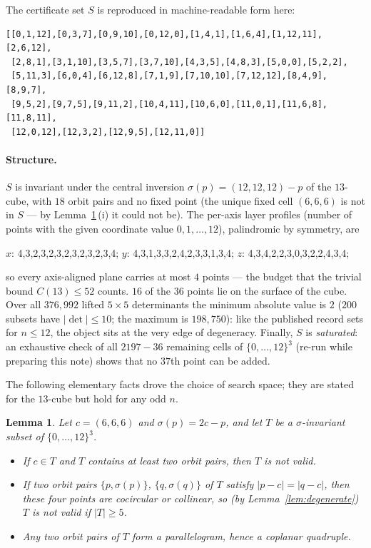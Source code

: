 \documentclass[10pt]{article}
\newtheorem{lemma}[theorem]{Lemma}
\theoremstyle{remark}
\begin{document}
The certificate set $S$ is reproduced in machine-readable form here:

{\scriptsize
\begin{verbatim}
[[0,1,12],[0,3,7],[0,9,10],[0,12,0],[1,4,1],[1,6,4],[1,12,11],[2,6,12],
 [2,8,1],[3,1,10],[3,5,7],[3,7,10],[4,3,5],[4,8,3],[5,0,0],[5,2,2],
 [5,11,3],[6,0,4],[6,12,8],[7,1,9],[7,10,10],[7,12,12],[8,4,9],[8,9,7],
 [9,5,2],[9,7,5],[9,11,2],[10,4,11],[10,6,0],[11,0,1],[11,6,8],[11,8,11],
 [12,0,12],[12,3,2],[12,9,5],[12,11,0]]
\end{verbatim}
}

\paragraph{Structure.}
$S$ is invariant under the central inversion $\sigma(p) = (12,12,12) - p$ of
the $13$-cube, with $18$ orbit pairs and no fixed point (the unique fixed
cell $(6,6,6)$ is not in $S$ --- by Lemma~\ref{lem:sym}\,(i) it could not
be). The per-axis layer profiles (number of points with the given
coordinate value $0,1,\dots,12$), palindromic by symmetry, are
\begin{center}\small
$x$: 4,3,2,3,2,3,2,3,2,3,2,3,4;\qquad
$y$: 4,3,1,3,3,2,4,2,3,3,1,3,4;\qquad
$z$: 4,3,4,2,2,3,0,3,2,2,4,3,4;
\end{center}
\noindent
so every axis-aligned plane carries at most $4$ points --- the budget that
the trivial bound $C(13) \le 52$ counts. $16$ of the $36$ points lie on the
surface of the cube. Over all $376{,}992$ lifted $5\times 5$ determinants
the minimum absolute value is $2$ ($200$ subsets have $|\det| \le 10$; the
maximum is $198{,}750$): like the published record sets for $n \le 12$, the
object sits at the very edge of degeneracy. Finally, $S$ is \emph{saturated}:
an exhaustive check of all $2197 - 36$ remaining cells of $\{0,\dots,12\}^3$
(re-run while preparing this note) shows that no $37$th point can be added.

The following elementary facts drove the choice of search space; they are
stated for the $13$-cube but hold for any odd $n$.

\begin{lemma}\label{lem:sym}
Let $c = (6,6,6)$ and $\sigma(p) = 2c - p$, and let $T$ be a
$\sigma$-invariant subset of $\{0,\dots,12\}^3$.
\begin{itemize}\itemsep1pt
\item[(i)] If $c \in T$ and $T$ contains at least two orbit pairs, then $T$
is not valid.
\item[(ii)] If two orbit pairs $\{p, \sigma(p)\}$, $\{q, \sigma(q)\}$ of $T$
satisfy $|p - c| = |q - c|$, then these four points are cocircular or
collinear, so (by Lemma~\ref{lem:degenerate}) $T$ is not valid if
$|T| \ge 5$.
\item[(iii)] Any two orbit pairs of $T$ form a parallelogram, hence a
coplanar quadruple.
\end{itemize}
\end{lemma}
\end{document}
